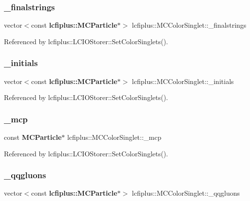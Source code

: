 \subsubsection{\+\_\+finalstrings}
{\footnotesize\ttfamily vector$<$const \textbf{ lcfiplus\+::\+M\+C\+Particle}$\ast$$>$ lcfiplus\+::\+M\+C\+Color\+Singlet\+::\+\_\+finalstrings}



Referenced by lcfiplus\+::\+L\+C\+I\+O\+Storer\+::\+Set\+Color\+Singlets().

\mbox{\label{classlcfiplus_1_1MCColorSinglet_af1d1b1bffab569127a4011e60f30aff5}} 
\subsubsection{\+\_\+initials}
{\footnotesize\ttfamily vector$<$const \textbf{ lcfiplus\+::\+M\+C\+Particle}$\ast$$>$ lcfiplus\+::\+M\+C\+Color\+Singlet\+::\+\_\+initials}



Referenced by lcfiplus\+::\+L\+C\+I\+O\+Storer\+::\+Set\+Color\+Singlets().

\mbox{\label{classlcfiplus_1_1MCColorSinglet_ab99f2cbcc5880430845ff3f343aa35da}} 
\subsubsection{\+\_\+mcp}
{\footnotesize\ttfamily const \textbf{ M\+C\+Particle}$\ast$ lcfiplus\+::\+M\+C\+Color\+Singlet\+::\+\_\+mcp}



Referenced by lcfiplus\+::\+L\+C\+I\+O\+Storer\+::\+Set\+Color\+Singlets().

\mbox{\label{classlcfiplus_1_1MCColorSinglet_a6a383590ece3c22af7ce6b1ce4345bf7}} 
\subsubsection{\+\_\+qqgluons}
{\footnotesize\ttfamily vector$<$const \textbf{ lcfiplus\+::\+M\+C\+Particle}$\ast$$>$ lcfiplus\+::\+M\+C\+Color\+Singlet\+::\+\_\+qqgluons}



